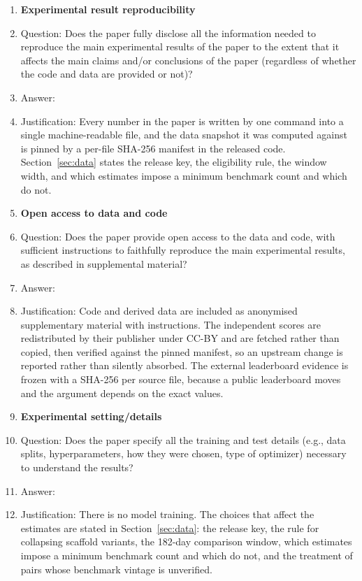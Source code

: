 \begin{enumerate}
    \item {\bf Experimental result reproducibility}
    \item[] Question: Does the paper fully disclose all the information needed to reproduce the main experimental results of the paper to the extent that it affects the main claims and/or conclusions of the paper (regardless of whether the code and data are provided or not)?
    \item[] Answer: \answerYes{}
    \item[] Justification: Every number in the paper is written by one command into a single machine-readable file, and the data snapshot it was computed against is pinned by a per-file SHA-256 manifest in the released code. Section~\ref{sec:data} states the release key, the eligibility rule, the window width, and which estimates impose a minimum benchmark count and which do not.



\item {\bf Open access to data and code}
    \item[] Question: Does the paper provide open access to the data and code, with sufficient instructions to faithfully reproduce the main experimental results, as described in supplemental material?
    \item[] Answer: \answerYes{}
    \item[] Justification: Code and derived data are included as anonymised supplementary material with instructions. The independent scores are redistributed by their publisher under CC-BY and are fetched rather than copied, then verified against the pinned manifest, so an upstream change is reported rather than silently absorbed. The external leaderboard evidence is frozen with a SHA-256 per source file, because a public leaderboard moves and the argument depends on the exact values.



\item {\bf Experimental setting/details}
    \item[] Question: Does the paper specify all the training and test details (e.g., data splits, hyperparameters, how they were chosen, type of optimizer) necessary to understand the results?
    \item[] Answer: \answerYes{}
    \item[] Justification: There is no model training. The choices that affect the estimates are stated in Section~\ref{sec:data}: the release key, the rule for collapsing scaffold variants, the 182-day comparison window, which estimates impose a minimum benchmark count and which do not, and the treatment of pairs whose benchmark vintage is unverified.



\end{enumerate}
